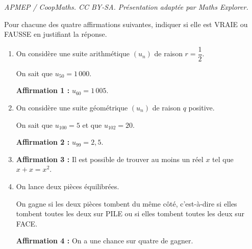 \documentclass[10pt]{article}
\begin{document}
\noindent\textit{APMEP / CoopMaths. CC BY-SA. Présentation adaptée par Maths Explorer.}\par\medskip
Pour chacune des quatre affirmations suivantes, indiquer si elle est VRAIE ou FAUSSE en justifiant la réponse.

\begin{enumerate}
\item On considère une suite arithmétique $(u_n)$ de raison $r = \dfrac{1}{2}$.

On sait que $u_{50} = 1\,000$.

\textbf{Affirmation 1 :} $u_{60} = 1\,005$.

\item On considère une suite géométrique $(u_n)$ de raison $q$ positive.

On sait que $u_{100} = 5$ et que $u_{102} = 20$.

\textbf{Affirmation 2 :} $u_{99} = 2,5$.

\item \textbf{Affirmation 3 :} Il est possible de trouver au moins un réel $x$ tel que $x + x = x^2$.

\item On lance deux pièces équilibrées.

On gagne si les deux pièces tombent du même côté, c'est-à-dire si elles tombent toutes les deux sur PILE ou si elles tombent toutes les deux sur FACE.

\textbf{Affirmation 4 :} On a une chance sur quatre de gagner.
\end{enumerate}
\end{document}
